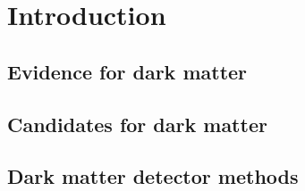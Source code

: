 \chapter{Introduction}\label{chap:intro}
\section{Evidence for dark matter}\label{sec:Intro/Evidence4DM}
\section{Candidates for dark matter}\label{sec:Intro/Candidates4DM}
\section{Dark matter detector methods}\label{sec:Intro/DetectionOfDM}